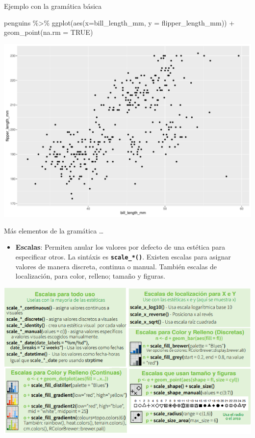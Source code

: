 \documentclass[
  ignorenonframetext,
  aspectratio=169]{beamer}
\newenvironment{Shaded}{\begin{snugshade}}{\end{snugshade}}
\newcommand{\AttributeTok}[1]{\textcolor[rgb]{0.77,0.63,0.00}{#1}}
\newcommand{\ConstantTok}[1]{\textcolor[rgb]{0.00,0.00,0.00}{#1}}
\newcommand{\FunctionTok}[1]{\textcolor[rgb]{0.00,0.00,0.00}{#1}}
\newcommand{\NormalTok}[1]{#1}
\newcommand{\SpecialCharTok}[1]{\textcolor[rgb]{0.00,0.00,0.00}{#1}}
\providecommand{\tightlist}{%
  \setlength{\itemsep}{0pt}\setlength{\parskip}{0pt}}
\begin{document}
\begin{frame}[fragile]{Ejemplo con la gramática básica}
\protect\hypertarget{ejemplo-con-la-gramuxe1tica-buxe1sica}{}
\begin{Shaded}
\begin{Highlighting}[]
\NormalTok{penguins }\SpecialCharTok{\%\textgreater{}\%} 
  \FunctionTok{ggplot}\NormalTok{(}\FunctionTok{aes}\NormalTok{(}\AttributeTok{x=}\NormalTok{bill\_length\_mm, }\AttributeTok{y =}\NormalTok{ flipper\_length\_mm)) }\SpecialCharTok{+}
  \FunctionTok{geom\_point}\NormalTok{(}\AttributeTok{na.rm =} \ConstantTok{TRUE}\NormalTok{)}
\end{Highlighting}
\end{Shaded}

\begin{center}\includegraphics[width=0.6\linewidth,height=0.6\textheight]{tidyverse_AD_files/figure-beamer/unnamed-chunk-120-1} \end{center}
\end{frame}

\begin{frame}[fragile]{Más elementos de la gramática \ldots{}}
\protect\hypertarget{muxe1s-elementos-de-la-gramuxe1tica}{}
\begin{itemize}
\tightlist
\item
  \textbf{Escalas}: Permiten anular los valores por defecto de una
  estética para especificar otros. La sintáxis es
  \textbf{\texttt{scale\_*()}}. Existen escalas para asignar valores de
  manera discreta, continua o manual. También escalas de localización,
  para color, relleno; tamaño y figuras.
\end{itemize}

\begin{center}\includegraphics[width=0.7\linewidth,height=0.6\textheight]{Imgs/escalas} \end{center}
\end{frame}
\end{document}
